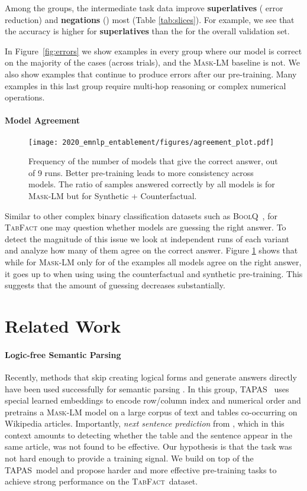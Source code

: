 \documentclass[11pt,a4paper]{article}
\newcommand{\tabfact}{\textsc{TabFact}\xspace}
\newcommand{\boolq}{\textsc{BoolQ}\xspace}
\newcommand{\tapas}{\textsc{TAPAS}\xspace}
\newcommand{\masklm}{\textsc{Mask-LM}\xspace}
\theoremstyle{definition}
\begin{document}
Among the groups, the intermediate task data improve \textbf{superlatives} ( error reduction) and \textbf{negations} () most (Table \ref{tab:slices}).
For example, we see that the accuracy is higher for \textbf{superlatives} than the for the overall validation set. 


In Figure~\ref{fig:errors} we show examples in every group where our model is correct on the majority of the cases (across  trials), and the \masklm baseline is not. We also show examples that continue to produce errors after our pre-training. Many examples in this last group require multi-hop reasoning or complex numerical operations.

\paragraph{Model Agreement}

\begin{figure}[!t]
\texttt{[image: 2020\_emnlp\_entablement/figures/agreement\_plot.pdf]}
\caption{
Frequency of the number of models that give the correct answer, out of 9 runs.
Better pre-training leads to more consistency across models.
The ratio of samples answered correctly by all models is  for \masklm but  for Synthetic + Counterfactual.
}
\label{fig:agreement}
\end{figure}

Similar to other complex binary classification datasets such as \boolq{}~\cite{clark-etal-2019-boolq}, for \tabfact{} one may question whether models are guessing the right answer.
To detect the magnitude of this issue we look at  independent runs of each variant and analyze how many of them agree on the correct answer. 
Figure \ref{fig:agreement} shows that while for \masklm only for  of the examples all models agree on the right answer, it goes up to  when using using the counterfactual and synthetic pre-training. This suggests that the amount of guessing decreases substantially. 

 \section{Related Work}
\label{sec:related}

\paragraph{Logic-free Semantic Parsing}
Recently, methods that skip creating logical forms and generate answers directly have been used successfully for semantic parsing \cite{mueller-2019}.
In this group, \tapas{}~\cite{herzig-2020} uses special learned embeddings to encode row/column index and numerical order and pretrains a \masklm model on a large corpus of text and tables co-occurring on Wikipedia articles. 
Importantly, \emph{next sentence prediction} 
from \citet{devlin-19}, 
which in this context amounts to detecting whether the table and the sentence appear in the same article, was not found to be effective. Our hypothesis is that the task was not hard enough to provide a training signal.
We build on top of the \tapas~model and propose harder and more effective pre-training tasks to achieve strong performance on the \tabfact~dataset.
\end{document}
